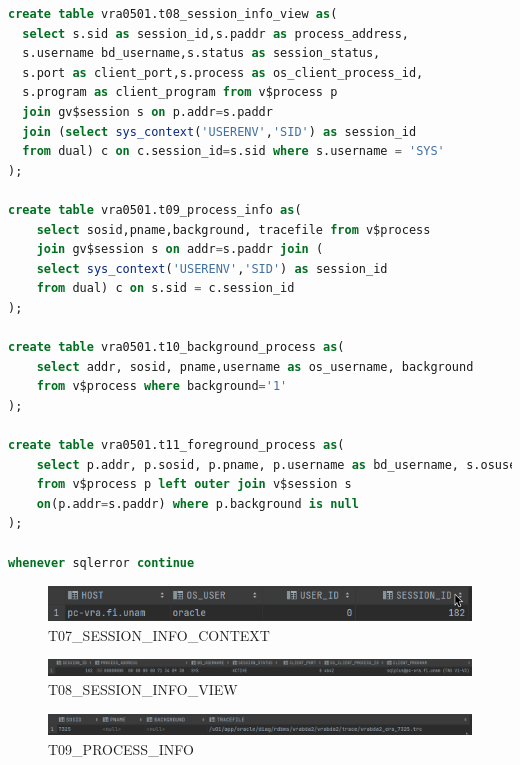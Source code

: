 \documentclass[journal]{IEEEtran}
\begin{document}
\begin{lstlisting}[language=sql, caption=s-04-procesos.sql,label={lst:codigo6}]
create table vra0501.t08_session_info_view as(
  select s.sid as session_id,s.paddr as process_address,
  s.username bd_username,s.status as session_status,
  s.port as client_port,s.process as os_client_process_id, 
  s.program as client_program from v$process p 
  join gv$session s on p.addr=s.paddr 
  join (select sys_context('USERENV','SID') as session_id
  from dual) c on c.session_id=s.sid where s.username = 'SYS'
);

create table vra0501.t09_process_info as(
    select sosid,pname,background, tracefile from v$process
	join gv$session s on addr=s.paddr join ( 
    select sys_context('USERENV','SID') as session_id
    from dual) c on s.sid = c.session_id 
);

create table vra0501.t10_background_process as(
    select addr, sosid, pname,username as os_username, background 
    from v$process where background='1'
);

create table vra0501.t11_foreground_process as(
    select p.addr, p.sosid, p.pname, p.username as bd_username, s.osuser as os_username, p.background 
    from v$process p left outer join v$session s 
    on(p.addr=s.paddr) where p.background is null
);

whenever sqlerror continue
\end{lstlisting}
\begin{figure}[H]
  \centering
  \includegraphics[scale=.25]{captura_7.png}
   \caption{T07\_SESSION\_INFO\_CONTEXT}
   \label{fig:validador_7}
\end{figure}
\begin{figure}[H]
  \centering
  \includegraphics[scale=.17]{captura_8.png}
   \caption{T08\_SESSION\_INFO\_VIEW}
   \label{fig:validador_8}
\end{figure}
\begin{figure}[H]
  \centering
  \includegraphics[scale=.20]{captura_9.png}
   \caption{T09\_PROCESS\_INFO}
   \label{fig:validador_9}
\end{figure}
\end{document}
